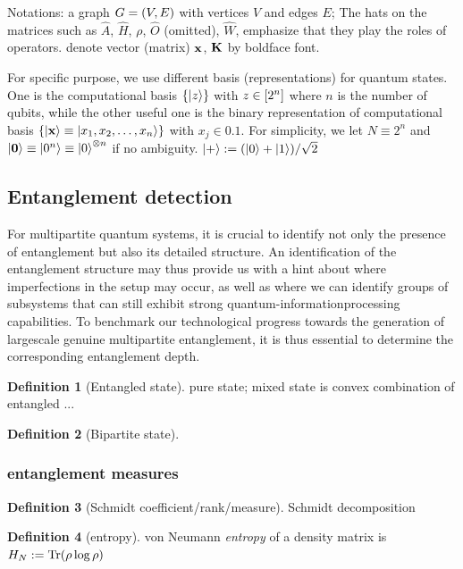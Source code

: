 \documentclass[
aps,
pra,
linenumbers,
floatfix,
]{revtex4-2}
\theoremstyle{plain}
\theoremstyle{definition}
\newtheorem{definition}{Definition}
\newcommand{\hamiltonian}{\hat{H}}
\newcommand{\ew}{\hat{W}}
\newcommand{\ob}{\hat{O}}
\newcommand{\dm}{\rho}
\begin{document}
Notations: a graph $G=(V,E)$ with vertices $V$ and edges $E$; 
The hats on the matrices such as $\hat{A}$, $\hamiltonian$, $\dm$, $\ob$ (omitted), $\ew$, emphasize that they play the roles of operators.
denote vector (matrix) $\vb{x}$, $\vb{K}$ by boldface font.

For specific purpose, we use different basis (representations) for quantum states.
One is the computational basis $\qty{\ket{z}}$ with $z\in \qty[2^n]$ where $n$ is the number of qubits,
while the other useful one is the binary representation of computational basis $\qty{\ket{\vb{x}}\equiv\ket{x_1,x_2,\dots,x_n}}$ with $x_j\in \qty{0,1}$. 
For simplicity, we let $N \equiv 2^n$ and $\ket{\vb{0}}\equiv\ket{0^n} \equiv\ket{0}^{\otimes n}$ if no ambiguity.
$\ket{+}: = (\ket{0}+\ket{1})/\sqrt{2} $

\subsection{Entanglement detection}
For multipartite quantum systems, it is crucial to identify not only the presence of entanglement but also its detailed structure.
An identification of the entanglement structure may thus provide us with a hint about where imperfections in the setup may occur, as well as where we can identify groups of subsystems that can still exhibit strong quantum-informationprocessing capabilities.
To benchmark our technological progress towards the generation of largescale genuine multipartite entanglement, it is thus essential to determine the corresponding entanglement depth.
\begin{definition}[Entangled state]
	pure state; mixed state is convex combination of entangled ...
\end{definition}
\begin{definition}[Bipartite state]
\end{definition}

\subsubsection{entanglement measures}
\begin{definition}[Schmidt coefficient/rank/measure]
	Schmidt decomposition
\end{definition}
\begin{definition}[entropy]\label{def:entropy}
	von Neumann \emph{entropy} of a density matrix is $H_N: = \Tr(\dm \log \dm)$
\end{definition}
\end{document}
